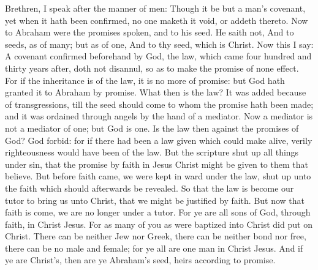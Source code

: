 Brethren, I speak after the manner of men: Though it be but a man’s covenant, yet when it hath been confirmed, no one maketh it void, or addeth thereto. Now to Abraham were the promises spoken, and to his seed. He saith not, And to seeds, as of many; but as of one, And to thy seed, which is Christ. Now this I say: A covenant confirmed beforehand by God, the law, which came four hundred and thirty years after, doth not disannul, so as to make the promise of none effect. For if the inheritance is of the law, it is no more of promise: but God hath granted it to Abraham by promise. What then is the law? It was added because of transgressions, till the seed should come to whom the promise hath been made; and it was ordained through angels by the hand of a mediator. Now a mediator is not a mediator of one; but God is one. Is the law then against the promises of God? God forbid: for if there had been a law given which could make alive, verily righteousness would have been of the law. But the scripture shut up all things under sin, that the promise by faith in Jesus Christ might be given to them that believe.  But before faith came, we were kept in ward under the law, shut up unto the faith which should afterwards be revealed. So that the law is become our tutor to bring us unto Christ, that we might be justified by faith. But now that faith is come, we are no longer under a tutor. For ye are all sons of God, through faith, in Christ Jesus. For as many of you as were baptized into Christ did put on Christ. There can be neither Jew nor Greek, there can be neither bond nor free, there can be no male and female; for ye all are one man in Christ Jesus. And if ye are Christ’s, then are ye Abraham’s seed, heirs according to promise. 

